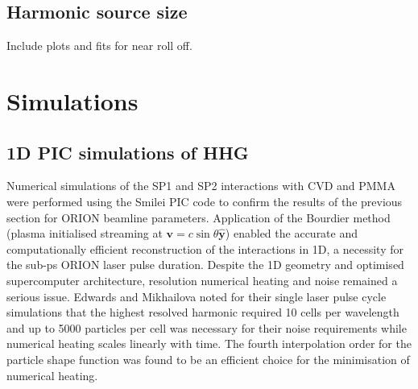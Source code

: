 \subsection{Harmonic source size}

Include plots and fits for near roll off.

\section{\label{ch:3-sec:simulations}Simulations}
\subsection{1D PIC simulations of HHG}
Numerical simulations of the SP1 and SP2 interactions with CVD and PMMA were performed using the Smilei PIC code to confirm the results of the previous section for ORION beamline parameters. Application of the Bourdier method (plasma initialised streaming at $\mathbf{v}= c\sin\theta \mathbf{\hat{y}}$) enabled the accurate and computationally efficient reconstruction of the interactions in 1D, a necessity for the sub-ps ORION laser pulse duration. Despite the 1D geometry and optimised supercomputer architecture, resolution numerical heating and noise remained a serious issue. Edwards and Mikhailova noted for their single laser pulse cycle simulations that the highest resolved harmonic required 10 cells per wavelength and up to 5000 particles per cell was necessary for their noise requirements \cite{edwardsXRayEmissionEffectiveness2020} while numerical heating scales linearly with time. The fourth interpolation order for the particle shape function was found to be an efficient choice for the minimisation of numerical heating.

